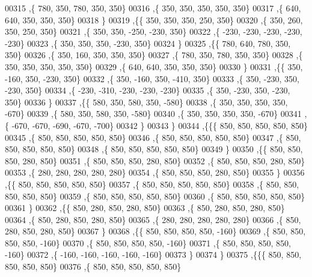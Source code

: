 \begin{DoxyCode}
00315    ,\{   780,   350,   780,   350,   350\}
00316    ,\{   350,   350,   350,   350,   350\}
00317    ,\{   640,   640,   350,   350,   350\}
00318    \}
00319   ,\{\{   350,   350,   350,   250,   350\}
00320    ,\{   350,   260,   350,   250,   350\}
00321    ,\{   350,   350,  -250,  -230,   350\}
00322    ,\{  -230,  -230,  -230,  -230,  -230\}
00323    ,\{   350,   350,   350,  -230,   350\}
00324    \}
00325   ,\{\{   780,   640,   780,   350,   350\}
00326    ,\{   350,   160,   350,   350,   350\}
00327    ,\{   780,   350,   780,   350,   350\}
00328    ,\{   350,   350,   350,   350,   350\}
00329    ,\{   640,   640,   350,   350,   350\}
00330    \}
00331   ,\{\{   350,  -160,   350,  -230,   350\}
00332    ,\{   350,  -160,   350,  -410,   350\}
00333    ,\{   350,  -230,   350,  -230,   350\}
00334    ,\{  -230,  -310,  -230,  -230,  -230\}
00335    ,\{   350,  -230,   350,  -230,   350\}
00336    \}
00337   ,\{\{   580,   350,   580,   350,  -580\}
00338    ,\{   350,   350,   350,   350,  -670\}
00339    ,\{   580,   350,   580,   350,  -580\}
00340    ,\{   350,   350,   350,   350,  -670\}
00341    ,\{  -670,  -670,  -690,  -670,  -700\}
00342    \}
00343   \}
00344  ,\{\{\{   850,   850,   850,   850,   850\}
00345    ,\{   850,   850,   850,   850,   850\}
00346    ,\{   850,   850,   850,   850,   850\}
00347    ,\{   850,   850,   850,   850,   850\}
00348    ,\{   850,   850,   850,   850,   850\}
00349    \}
00350   ,\{\{   850,   850,   850,   280,   850\}
00351    ,\{   850,   850,   850,   280,   850\}
00352    ,\{   850,   850,   850,   280,   850\}
00353    ,\{   280,   280,   280,   280,   280\}
00354    ,\{   850,   850,   850,   280,   850\}
00355    \}
00356   ,\{\{   850,   850,   850,   850,   850\}
00357    ,\{   850,   850,   850,   850,   850\}
00358    ,\{   850,   850,   850,   850,   850\}
00359    ,\{   850,   850,   850,   850,   850\}
00360    ,\{   850,   850,   850,   850,   850\}
00361    \}
00362   ,\{\{   850,   280,   850,   280,   850\}
00363    ,\{   850,   280,   850,   280,   850\}
00364    ,\{   850,   280,   850,   280,   850\}
00365    ,\{   280,   280,   280,   280,   280\}
00366    ,\{   850,   280,   850,   280,   850\}
00367    \}
00368   ,\{\{   850,   850,   850,   850,  -160\}
00369    ,\{   850,   850,   850,   850,  -160\}
00370    ,\{   850,   850,   850,   850,  -160\}
00371    ,\{   850,   850,   850,   850,  -160\}
00372    ,\{  -160,  -160,  -160,  -160,  -160\}
00373    \}
00374   \}
00375  ,\{\{\{   850,   850,   850,   850,   850\}
00376    ,\{   850,   850,   850,   850,   850\}

\end{DoxyCode}
